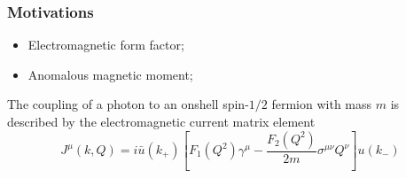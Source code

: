 \begin{frame}\frametitle{Motivations}
  \begin{itemize}
  	\item Electromagnetic form factor;
  	\item Anomalous magnetic moment;
  \end{itemize}
  \vspace{2mm}

  The coupling of a photon to an onshell spin-$1/2$ fermion with mass $m$ is described by the electromagnetic
  current matrix element
  \begin{equation}
  	J^\mu(k, Q)=i\bar{u}(k_+)\left[F_1(Q^2)\gamma^\mu-\frac{F_2(Q^2)}{2m}\sigma^{\mu\nu}Q^\nu\right]u(k_-)
  \end{equation}
\end{frame}
\endinput
